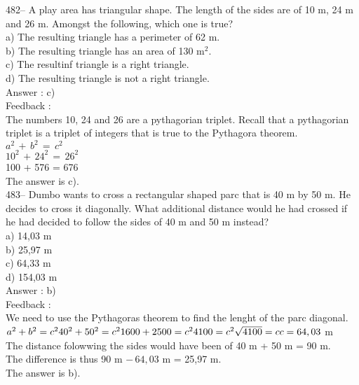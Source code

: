 ﻿\documentclass[letterpaper, 12pt]{article}
\begin{document}
482-- A play area has triangular shape. The length of the sides are of 10 m, 24 m and 26 m. Amongst the following, which one is true?\\
a) The resulting triangle has a perimeter of 62 m.\\
b) The resulting triangle has an area of 130 m$^{2}$.\\
c) The resultinf triangle is a right triangle.\\
d) The resulting triangle is not a right triangle.\\

Answer :  c)\\

Feedback : \\
The numbers 10, 24 and 26 are a pythagorian triplet. Recall that a pythagorian triplet is a triplet of integers that is true to the Pythagora theorem.\\
$a^{2}\,+\,b^{2}\,=\,c^{2}$\\
$10^{2}\,+\,24^{2}\,=\,26^{2}$\\
100 + 576 = 676\\
The answer is c).\\

483-- Dumbo wants to cross a rectangular shaped parc that is 40 m by 50 m. He decides to cross it diagonally. What additional distance would he had crossed if he had decided to follow the sides of 40 m and 50 m instead?\\
a) 14,03 m\\
b) 25,97 m\\
c) 64,33 m\\
d) 154,03 m\\


Answer : b)\\

Feedback : \\
We need to use the Pythagoras theorem to find the lenght of the parc diagonal.\\
$a^{2}+b^{2}=c^{2}\\
40^{2}+50^{2}=c^{2}\\
1600+2500=c^{2}\\
4100=c^{2}\\
\sqrt{4100}=c\\
c=64,03$ m\\
The distance folowwing the sides would have been of 40
m + 50 m = 90 m.\\
The difference is thus 90 m $-\,64,03$ m = 25,97 m.\\
The answer is b).\\
\end{document}
